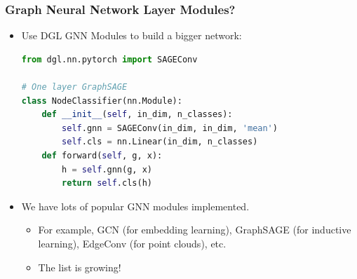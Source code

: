 \documentclass[10pt,aspectratio=169]{beamer}
\begin{document}
	\begin{frame}[fragile]
		\frametitle{Graph Neural Network Layer Modules?}
		\begin{itemize}
			\item Use DGL GNN Modules to build a bigger network:
\begin{lstlisting}[language=Python]
from dgl.nn.pytorch import SAGEConv

# One layer GraphSAGE
class NodeClassifier(nn.Module):
    def __init__(self, in_dim, n_classes):
        self.gnn = SAGEConv(in_dim, in_dim, 'mean')
        self.cls = nn.Linear(in_dim, n_classes)
    def forward(self, g, x):
        h = self.gnn(g, x)
        return self.cls(h)
\end{lstlisting}
			\item We have lots of popular GNN modules implemented.
			\begin{itemize}
				\item For example, GCN (for embedding learning), GraphSAGE (for inductive learning), EdgeConv (for point clouds), etc.
				\item The list is growing!
			\end{itemize}
		\end{itemize}
	\end{frame}
	
\end{document}
